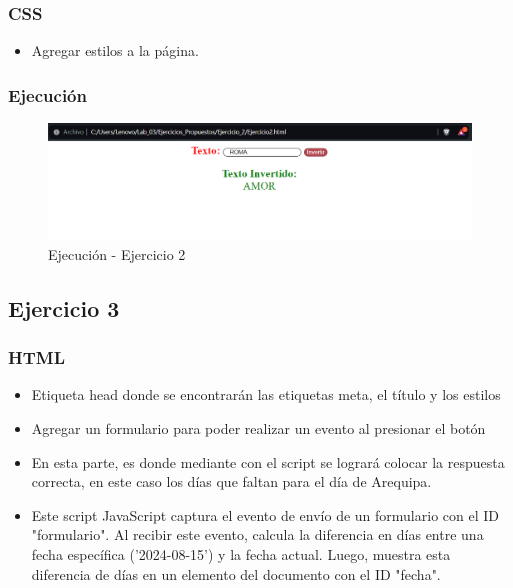 \documentclass{article}
\begin{document}
	\subsubsection{CSS}
	\begin{itemize}
		\item Agregar estilos a la página.
		
	\end{itemize}
	\subsubsection{Ejecución}
	\begin{figure}[H]
		\centering
		\includegraphics[width=1\textwidth,keepaspectratio]{img/HTML1.png}
		\caption{Ejecución - Ejercicio 2}
	\end{figure}
	\subsection{Ejercicio 3}
	\subsubsection{HTML}
	\begin{itemize}
		\item Etiqueta head donde se encontrarán las etiquetas meta, el título y los estilos  
		
		\newpage
		\item Agregar un formulario para poder realizar un evento al presionar el botón
		
		\item En esta parte, es donde mediante con el script se logrará colocar la respuesta correcta, en este caso los días que faltan para el día de Arequipa. 
		
		\item Este script JavaScript captura el evento de envío de un formulario con el ID "formulario". Al recibir este evento, calcula la diferencia en días entre una fecha específica ('2024-08-15') y la fecha actual. Luego, muestra esta diferencia de días en un elemento del documento con el ID "fecha".
		
	\end{itemize}
\end{document}
